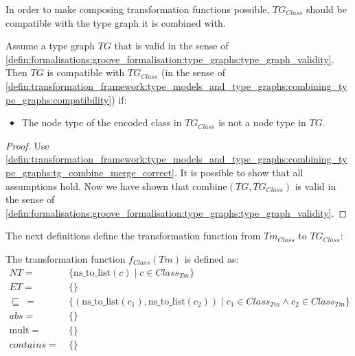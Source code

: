 In order to make composing transformation functions possible, $TG_{Class}$ should be compatible with the type graph it is combined with.

\begin{thm}
\label{defin:library_of_transformations:type_level_transformations:regular_classes:tg_class_as_node_type_combine_correct}
Assume a type graph $TG$ that is valid in the sense of \cref{defin:formalisations:groove_formalisation:type_graphs:type_graph_validity}. Then $TG$ is compatible with $TG_{Class}$ (in the sense of \cref{defin:transformation_framework:type_models_and_type_graphs:combining_type_graphs:compatibility}) if:
\begin{itemize}
    \item The node type of the encoded class in $TG_{Class}$ is not a node type in $TG$.
\end{itemize}
\end{thm}

\begin{proof}
Use \cref{defin:transformation_framework:type_models_and_type_graphs:combining_type_graphs:tg_combine_merge_correct}. It is possible to show that all assumptions hold. Now we have shown that $\mathrm{combine}(TG, TG_{Class})$ is valid in the sense of \cref{defin:formalisations:groove_formalisation:type_graphs:type_graph_validity}.
\end{proof}

The next definitions define the transformation function from $Tm_{Class}$ to $TG_{Class}$:

\begin{defin}
\label{defin:library_of_transformations:type_level_transformations:regular_classes:tmod_class_to_tg_class_as_node_type}
The transformation function $f_{Class}(Tm)$ is defined as:
\begin{align*}
NT =\ &\{\mathrm{ns\_\!to\_\!list}(c) \mid c \in Class_{Tm}\} \\
ET =\ &\{\} \\
\!\!\sqsubseteq\ =\ &\{( \mathrm{ns\_\!to\_\!list}(c_1), \mathrm{ns\_\!to\_\!list}(c_2) ) \mid c_1 \in Class_{Tm} \land c_2 \in Class_{Tm} \} \\
abs =\ &\{\} \\
\mathrm{mult} =\ &\{\} \\
contains =\ &\{\}
\end{align*}
\end{defin}


